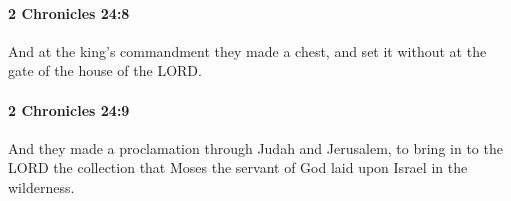 		\paragraph{2 Chronicles 24:8} %
			\label{2CHRONICLES-24-8}

			And at the king's commandment they made a chest, and set it without at the gate of the house of the LORD.


		\paragraph{2 Chronicles 24:9} %
			\label{2CHRONICLES-24-9}

			And they made a proclamation through Judah and Jerusalem, to bring in to the LORD the collection that Moses the servant of God laid upon Israel in the wilderness.


